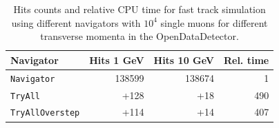 \begin{table}[ht]
    \centering
    \begin{tabular}{lrrr}
        \hline
        \textbf{Navigator} & \textbf{Hits 1 GeV} & \textbf{Hits 10 GeV} & \textbf{Rel. time} \\
        \hline
        \texttt{Navigator}      & 138599 & 138674 &   1 \\
        \texttt{TryAll}         &   +128 &    +18 & 490 \\
        \texttt{TryAllOverstep} &   +114 &    +14 & 407 \\
        \hline
    \end{tabular}
    \caption{Hits counts and relative CPU time for fast track simulation using different navigators with $10^4$ single muons for different transverse momenta in the OpenDataDetector.}
    \label{tab:dev/nav/tryall-performance}
\end{table}

